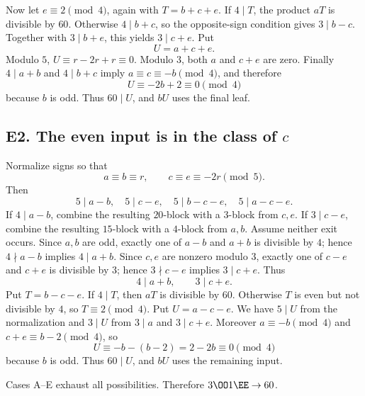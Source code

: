 Now let $e\equiv2\pmod4$, again with $T=b+c+e$.  If $4\mid T$, the product
$aT$ is divisible by $60$.  Otherwise $4\mid b+c$, so the opposite-sign
condition gives $3\mid b-c$.  Together with $3\mid b+e$, this yields
$3\mid c+e$.  Put
\[
 U=a+c+e.
\]
Modulo $5$, $U\equiv r-2r+r\equiv0$.  Modulo $3$, both $a$ and $c+e$ are
zero.  Finally $4\mid a+b$ and $4\mid b+c$ imply
$a\equiv c\equiv-b\pmod4$, and therefore
\[
 U\equiv-2b+2\equiv0\pmod4
\]
because $b$ is odd.  Thus $60\mid U$, and $bU$ uses the final leaf.

\subsection*{\texorpdfstring{E2. The even input is in the class of $c$}{E2. The even input is in the class of c}}\label{app:caseE2}

Normalize signs so that
\[
 a\equiv b\equiv r,
 \qquad c\equiv e\equiv-2r\pmod5.
\]
Then
\[
5\mid a-b,\quad5\mid c-e,\quad
5\mid b-c-e,\quad5\mid a-c-e.
\]
If $4\mid a-b$, combine the resulting $20$-block with a $3$-block from
$c,e$.  If $3\mid c-e$, combine the resulting $15$-block with a $4$-block
from $a,b$.  Assume neither exit occurs.  Since $a,b$ are odd, exactly one
of $a-b$ and $a+b$ is divisible by $4$; hence $4\nmid a-b$ implies
$4\mid a+b$.  Since $c,e$ are nonzero modulo $3$, exactly one of $c-e$ and
$c+e$ is divisible by $3$; hence $3\nmid c-e$ implies $3\mid c+e$.  Thus
\[
4\mid a+b,
\qquad3\mid c+e.
\]
Put $T=b-c-e$.  If $4\mid T$, then $aT$ is divisible by $60$.  Otherwise
$T$ is even but not divisible by $4$, so $T\equiv2\pmod4$.  Put
$U=a-c-e$.  We have $5\mid U$ from the normalization and $3\mid U$ from
$3\mid a$ and $3\mid c+e$.  Moreover $a\equiv-b\pmod4$ and
$c+e\equiv b-2\pmod4$, so
\[
 U\equiv-b-(b-2)=2-2b\equiv0\pmod4
\]
because $b$ is odd.  Thus $60\mid U$, and $bU$ uses the remaining input.

Cases A--E exhaust all possibilities.  Therefore
$3\OO1\EE\to60$.
